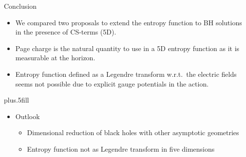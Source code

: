 \documentclass{beamer}
\begin{document}
\begin{frame}{Conclusion}

  \begin{itemize}
  \item
    We compared two proposals to extend the entropy function to BH solutions in the 
    presence of CS-terms (5D).
  \item
    Page charge is the natural quantity to use in a 5D entropy function as it is measurable 
    at the horizon.
  \item
    Entropy function defined as a Legendre transform w.r.t.\ the electric fields seems
    not possible due to explicit gauge potentials in the action.

  \end{itemize}
  
  \vskip0pt plus.5fill
  \begin{itemize}
  \item
    Outlook
    \begin{itemize}
    \item
      Dimensional reduction of black holes with other asymptotic geometries
    \item
      Entropy function not as Legendre transform in five dimensions
    \end{itemize}
  \end{itemize}
\end{frame}

\begin{frame}

\end{frame}
\end{document}
